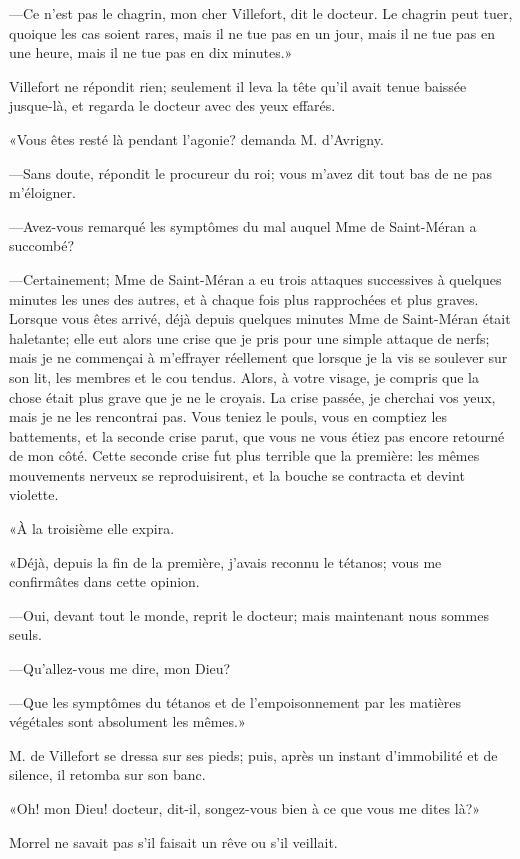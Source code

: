 —Ce n'est pas le chagrin, mon cher Villefort, dit le docteur. Le chagrin peut tuer, quoique les cas soient rares, mais il ne tue pas en un jour, mais il ne tue pas en une heure, mais il ne tue pas en dix minutes.» 

Villefort ne répondit rien; seulement il leva la tête qu'il avait tenue baissée jusque-là, et regarda le docteur avec des yeux effarés. 

«Vous êtes resté là pendant l'agonie? demanda M. d'Avrigny. 

—Sans doute, répondit le procureur du roi; vous m'avez dit tout bas de ne pas m'éloigner. 

—Avez-vous remarqué les symptômes du mal auquel Mme de Saint-Méran a succombé? 

—Certainement; Mme de Saint-Méran a eu trois attaques successives à quelques minutes les unes des autres, et à chaque fois plus rapprochées et plus graves. Lorsque vous êtes arrivé, déjà depuis quelques minutes Mme de Saint-Méran était haletante; elle eut alors une crise que je pris pour une simple attaque de nerfs; mais je ne commençai à m'effrayer réellement que lorsque je la vis se soulever sur son lit, les membres et le cou tendus. Alors, à votre visage, je compris que la chose était plus grave que je ne le croyais. La crise passée, je cherchai vos yeux, mais je ne les rencontrai pas. Vous teniez le pouls, vous en comptiez les battements, et la seconde crise parut, que vous ne vous étiez pas encore retourné de mon côté. Cette seconde crise fut plus terrible que la première: les mêmes mouvements nerveux se reproduisirent, et la bouche se contracta et devint violette. 

«À la troisième elle expira. 

«Déjà, depuis la fin de la première, j'avais reconnu le tétanos; vous me confirmâtes dans cette opinion. 

—Oui, devant tout le monde, reprit le docteur; mais maintenant nous sommes seuls. 

—Qu'allez-vous me dire, mon Dieu? 

—Que les symptômes du tétanos et de l'empoisonnement par les matières végétales sont absolument les mêmes.» 

M. de Villefort se dressa sur ses pieds; puis, après un instant d'immobilité et de silence, il retomba sur son banc.  

«Oh! mon Dieu! docteur, dit-il, songez-vous bien à ce que vous me dites là?» 

Morrel ne savait pas s'il faisait un rêve ou s'il veillait. 

